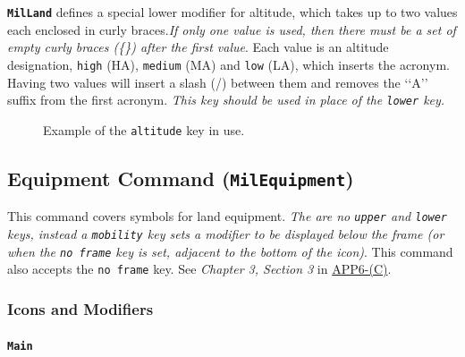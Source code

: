 \documentclass[a4paper, titlepage]{article}
\newcommand\DocLink{\href{https://www.awl.edu.pl/images/en/APP_6_C.pdf}{APP6-(C)}}
\begin{document}
\textbf{\texttt{MilLand}} defines a special lower modifier for altitude, which takes up to two values each enclosed in curly braces.\textit{If only one value is used, then there must be a set of empty curly braces (\{\}) after the first value}. Each value is an altitude designation, \texttt{high} (HA), \texttt{medium} (MA) and \texttt{low} (LA), which inserts the acronym. Having two values will insert a slash (/) between them and removes the \lq\lq{}A\rq\rq{} suffix from the first acronym. \textit{This key should be used in place of the \texttt{lower} key.}

\begin{figure}[H]
\centering
{}
\caption{Example of the \texttt{altitude} key in use.}
\end{figure}

\subsection{Equipment Command (\textbf{\texttt{MilEquipment}})}

This command covers symbols for land equipment. \textit{The are no \texttt{upper} and \texttt{lower} keys, instead a \texttt{mobility} key sets a modifier to be displayed below the frame (or when the \texttt{no frame} key is set, adjacent to the bottom of the icon)}. This command also accepts the \texttt{no frame} key. See \textit{Chapter 3, Section 3} in \DocLink.

\subsubsection{Icons and Modifiers}

\paragraph{\texttt{Main}}\quad

\end{document}

